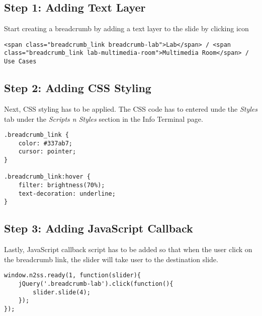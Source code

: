 \subsection*{Step 1: Adding Text Layer}
Start creating a breadcrumb by adding a text layer to the slide by clicking  icon

\begin{lstlisting}
<span class="breadcrumb_link breadcrumb-lab">Lab</span> / <span class="breadcrumb_link lab-multimedia-room">Multimedia Room</span> / Use Cases
\end{lstlisting}

\subsection*{Step 2: Adding CSS Styling}
Next, CSS styling has to be applied. The CSS code has to entered unde the \emph{Styles} tab under the \emph{Scripts n Styles} section in the Info Terminal page.

\begin{lstlisting}
.breadcrumb_link {
	color: #337ab7;
	cursor: pointer;
}

.breadcrumb_link:hover {
	filter: brightness(70%);
	text-decoration: underline;
}
\end{lstlisting}

\subsection*{Step 3: Adding JavaScript Callback}
Lastly, JavaScript callback script has to be added so that when the user click on the breadcrumb link, the slider will take user to the destination slide.
\begin{lstlisting}
window.n2ss.ready(1, function(slider){
	jQuery('.breadcrumb-lab').click(function(){
		slider.slide(4);
	});
});
\end{lstlisting}